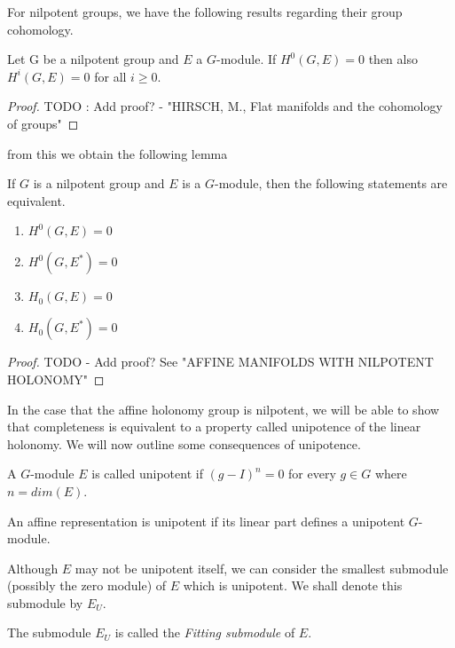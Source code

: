 For nilpotent groups, we have the following results regarding their group
cohomology.

\begin{lemma}
    Let G be a nilpotent group and $E$ a $G$-module. If $H^0(G, E) = 0$ then
    also $H^i(G, E) = 0$ for all $i \geq 0$.
    \label{lemma:nilpotent-group-coho}
\end{lemma}
\begin{proof}
    TODO : Add proof? - "HIRSCH, M., Flat manifolds and the cohomology of groups"
\end{proof}

from this we obtain the following lemma
\begin{lemma}
    If $G$ is a nilpotent group and $E$ is a $G$-module, then the following statements are equivalent.
    \label{lemma:nilpotent-group-equiv-hom-coho}
    \begin{enumerate}
        \item $H^0(G, E) = 0$
        \item $H^0(G, E^*) = 0$
        \item $H_0(G, E) = 0$
        \item $H_0(G, E^*) = 0$
    \end{enumerate}
\end{lemma}

\begin{proof}
    TODO - Add proof? See "AFFINE MANIFOLDS WITH NILPOTENT HOLONOMY"
\end{proof}

In the case that the affine holonomy group is nilpotent, we will be able to
show that completeness is equivalent to a property called unipotence of the
linear holonomy. We will now outline some consequences of unipotence.

\begin{definition}[Unipotent]
    A $G$-module $E$ is called unipotent if $(g-I)^n = 0$ for every $g \in G$
    where $n = dim(E)$.
\end{definition}
\begin{remark}
    An affine representation is unipotent if its linear part defines a unipotent
    $G$-module.
\end{remark}

Although $E$ may not be unipotent itself, we can consider the smallest
submodule (possibly the zero module) of $E$ which is unipotent. We shall denote
this submodule by $E_U$.

\begin{remark}
    The submodule $E_U$ is called the \textit{Fitting submodule} of $E$.
\end{remark}

